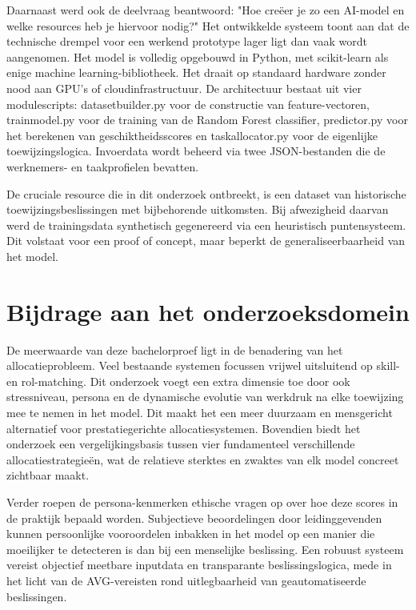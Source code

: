 \vspace{1em}Daarnaast werd ook de deelvraag beantwoord: "Hoe creëer je zo een AI-model en welke resources heb je hiervoor nodig?" Het ontwikkelde systeem toont aan dat de technische drempel voor een werkend prototype lager ligt dan vaak wordt aangenomen. Het model is volledig opgebouwd in Python, met scikit-learn als enige machine learning-bibliotheek. Het draait op standaard hardware zonder nood aan GPU's of cloudinfrastructuur. De architectuur bestaat uit vier modulescripts: datasetbuilder.py voor de constructie van feature-vectoren, trainmodel.py voor de training van de Random Forest classifier, predictor.py voor het berekenen van geschiktheidsscores en taskallocator.py voor de eigenlijke toewijzingslogica. Invoerdata wordt beheerd via twee JSON-bestanden die de werknemers- en taakprofielen bevatten.

De cruciale resource die in dit onderzoek ontbreekt, is een dataset van historische toewijzingsbeslissingen met bijbehorende uitkomsten. Bij afwezigheid daarvan werd de trainingsdata synthetisch gegenereerd via een heuristisch puntensysteem. Dit volstaat voor een proof of concept, maar beperkt de generaliseerbaarheid van het model.

\section{Bijdrage aan het onderzoeksdomein}
\vspace{1em}De meerwaarde van deze bachelorproef ligt in de benadering van het allocatieprobleem. Veel bestaande systemen focussen vrijwel uitsluitend op skill- en rol-matching. Dit onderzoek voegt een extra dimensie toe door ook stressniveau, persona en de dynamische evolutie van werkdruk na elke toewijzing mee te nemen in het model. Dit maakt het een meer duurzaam en mensgericht alternatief voor prestatiegerichte allocatiesystemen. Bovendien biedt het onderzoek een vergelijkingsbasis tussen vier fundamenteel verschillende allocatiestrategieën, wat de relatieve sterktes en zwaktes van elk model concreet zichtbaar maakt.

Verder roepen de persona-kenmerken ethische vragen op over hoe deze scores in de praktijk bepaald worden. Subjectieve beoordelingen door leidinggevenden kunnen persoonlijke vooroordelen inbakken in het model op een manier die moeilijker te detecteren is dan bij een menselijke beslissing. Een robuust systeem vereist objectief meetbare inputdata en transparante beslissingslogica, mede in het licht van de AVG-vereisten rond uitlegbaarheid van geautomatiseerde beslissingen.

